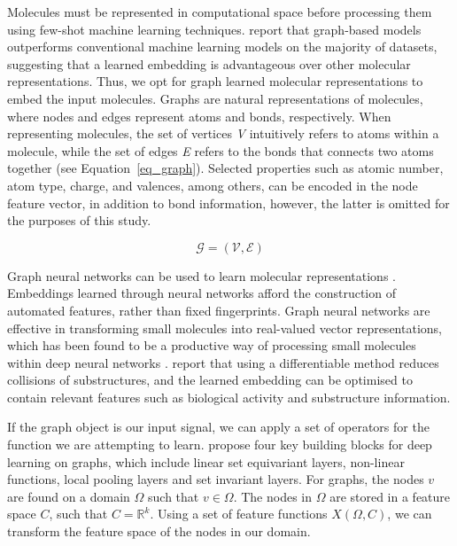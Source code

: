 Molecules must be represented in computational space before processing them using few-shot machine learning techniques. \citet{wu2018moleculenet} report that graph-based models outperforms conventional machine learning models on the majority of datasets, suggesting that a learned embedding is advantageous over other molecular representations. Thus, we opt for graph learned molecular representations to embed the input molecules. Graphs are natural representations of molecules, where nodes and edges represent atoms and bonds, respectively. When representing molecules, the set of vertices \textit{V} intuitively refers to atoms within a molecule, while the set of edges \textit{E} refers to the bonds that connects two atoms together (see Equation~\ref{eq_graph}). Selected properties such as atomic number, atom type, charge, and valences, among others, can be encoded in the node feature vector, in addition to bond information, however, the latter is omitted for the purposes of this study.

\begin{equation}\label{eq_graph}
	\mathcal{G}=(\mathcal{V}, \mathcal{E})
\end{equation}

Graph neural networks can be used to learn molecular representations \cite{jiang2021could}. Embeddings learned through neural networks afford the construction of automated features, rather than fixed fingerprints. Graph neural networks are effective in transforming small molecules into real-valued vector representations, which has been found to be a productive way of processing small molecules within deep neural networks \cite{gomez2018automatic}. \citet{duvenaud2015convolutional} report that using a differentiable method reduces collisions of substructures, and the learned embedding can be optimised to contain relevant features such as biological activity and substructure information.

If the graph object is our input signal, we can apply a set of operators for the function we are attempting to learn. \citet{bronstein2021geometric} propose four key building blocks for deep learning on graphs, which include linear set equivariant layers, non-linear functions, local pooling layers and set invariant layers. For graphs, the nodes $v$ are found on a domain $\Omega$ such that $v \in \Omega$. The nodes in $\Omega$ are stored in a feature space $C$, such that $C = \mathbb{R}^k$. Using a set of feature functions $X(\Omega, C)$, we can transform the feature space of the nodes in our domain. 

